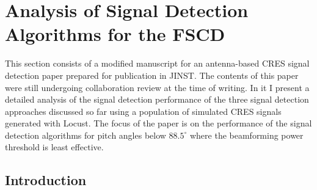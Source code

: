 \section{Analysis of Signal Detection Algorithms for the FSCD}
\label{sec:chap4-trigger-paper}
This section consists of a modified manuscript for an antenna-based CRES signal detection paper prepared for publication in JINST. The contents of this paper were still undergoing collaboration review at the time of writing. In it I present a detailed analysis of the signal detection performance of the three signal detection approaches discussed so far using a population of simulated CRES signals generated with Locust. The focus of the paper is on the performance of the signal detection algorithms for pitch angles below $88.5^\circ$ where the beamforming power threshold is least effective. 

\subsection{Introduction}

\label{sec:intro}


